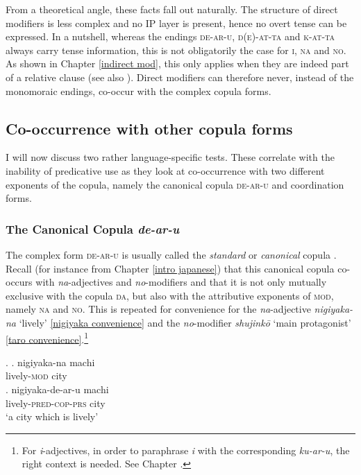 \documentclass [output=book,colorlinks,citecolor=brown]{langscibook}
\begin{document}
From a theoretical angle, these facts fall out naturally. The structure of direct modifiers is less complex and no IP layer is present, hence no overt tense can be expressed. In a nutshell, whereas the endings \textsc{de-ar-u}, \textsc{d(e)-at-ta} and \textsc{k-at-ta} always carry tense information, this is not obligatorily the case for \textsc{i}, \textsc{na} and \textsc{no}. As shown in Chapter \ref{indirect mod}, this only applies when they are indeed part of a relative clause (see also \citealt[793]{watanabe:2017:attributive}). Direct modifiers can therefore never, instead of the monomoraic endings, co-occur with the complex copula forms.

\subsection{Co-occurrence with other copula forms} \label{copula}

I will now discuss two rather language-specific tests. These correlate with the inability of predicative use as they look at co-occurrence with two different exponents of the copula, namely the canonical copula \textsc{de-ar-u} and coordination forms. %

\subsubsection{The Canonical Copula \textit{de-ar-u}}

The complex form \textsc{de-ar-u} is usually called the \textit{standard} or \textit{canonical} copula \citep{urushibara:1993:syntactic, nishiyama:1999:adj, nakahara:2002:japanese}. Recall (for instance from Chapter \ref{intro japanese}) that this canonical copula co-occurs with \textit{na}-adjectives and \textit{no}-modifiers and that it is not only mutually exclusive with the copula \textsc{da}, but also with the attributive exponents of \textsc{mod}, namely \textsc{na} and \textsc{no}. This is repeated for convenience for the \textit{na}-adjective \textit{nigiyaka-na} `lively’ \ref{nigiyaka convenience} and the \textit{no}-modifier \textit{shujinkō} `main protagonist’ \ref{taro convenience}.\footnote{For \textit{i}-adjectives, in order to paraphrase \textit{i} with the corresponding \textit{ku-ar-u}, the right context is needed. See Chapter .} %

\ex. \label{nigiyaka convenience} \ag. nigiyaka-na machi\\
lively-\textsc{mod} city\\
\bg. nigiyaka-de-ar-u machi\\
lively-\textsc{pred-cop-prs} city\\
`a city which is lively’
\end{document}
